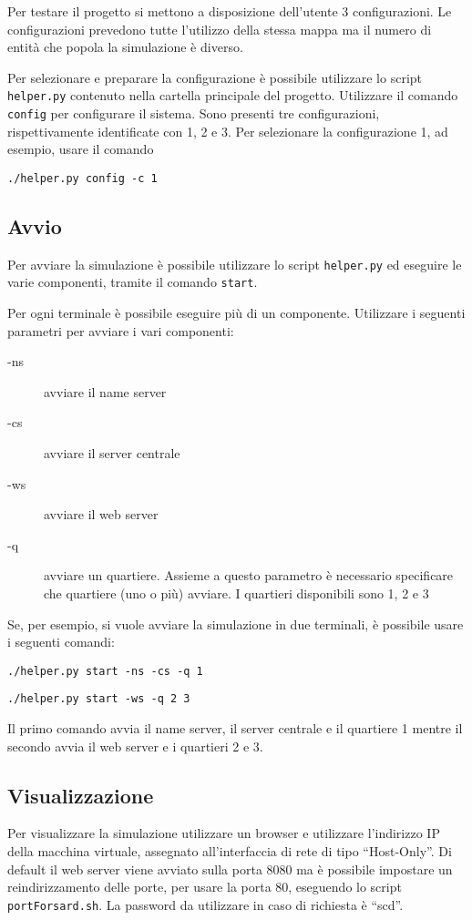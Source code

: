 Per testare il progetto si mettono a disposizione dell'utente 3 configurazioni.
Le configurazioni prevedono tutte l'utilizzo della stessa mappa ma il numero di
entità che popola la simulazione è diverso.

Per selezionare e preparare la configurazione è possibile utilizzare lo script
\texttt{helper.py} contenuto nella cartella principale del progetto.
Utilizzare il comando \texttt{config} per configurare il sistema. Sono presenti
tre configurazioni, rispettivamente identificate con 1, 2 e 3. Per selezionare
la configurazione 1, ad esempio, usare il comando

\begin{center}
	\texttt{./helper.py config -c 1}
\end{center}

\subsection{Avvio}
Per avviare la simulazione è possibile utilizzare lo script \texttt{helper.py}
ed eseguire le varie componenti, tramite il comando \texttt{start}.

Per ogni terminale è possibile eseguire più di un componente. Utilizzare i
seguenti parametri per avviare i vari componenti:
\begin{description}
	\item[-ns] avviare il name server
	\item[-cs] avviare il server centrale
	\item[-ws] avviare il web server
	\item[-q] avviare un quartiere. Assieme a questo parametro è necessario
	specificare che quartiere (uno o più) avviare. I quartieri disponibili sono 1,
	2 e 3
\end{description}

Se, per esempio, si vuole avviare la simulazione in due terminali, è possibile
usare i seguenti comandi:
\begin{center}
	\texttt{./helper.py start -ns -cs -q 1}
	
	\texttt{./helper.py start -ws -q 2 3}
\end{center}

Il primo comando avvia il name server, il server centrale e il quartiere 1
mentre il secondo avvia il web server e i quartieri 2 e 3.

\subsection{Visualizzazione}
Per visualizzare la simulazione utilizzare un browser e utilizzare l'indirizzo
IP della macchina virtuale, assegnato all'interfaccia di rete di tipo
``Host-Only''. Di default il web server viene avviato sulla porta 8080 ma è
possibile impostare un reindirizzamento delle porte, per usare la porta 80,
eseguendo lo script \texttt{portForsard.sh}. La password da utilizzare in caso
di richiesta è ``scd''.

